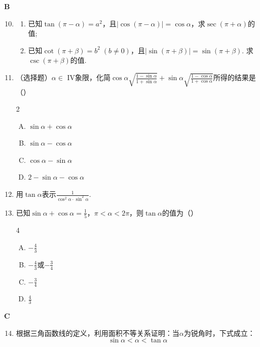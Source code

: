 \begin{center}
    \bfseries B
\end{center}
\begin{enumerate}\setcounter{enumi}{9}
    \item \begin{enumerate}[(1)]
        \item 已知$\tan(\pi-\alpha)=a^2$，且$|\cos(\pi-\alpha)|=\cos\alpha$，求$\sec(\pi+\alpha)$的值;
        \item 已知$\cot(\pi+\beta)=b^2\; (b\ne 0)$，且$|\sin(\pi+\beta)|=\sin(\pi+\beta)$. 求$\csc(\pi+\beta)$的值.
    \end{enumerate}

\item （选择题）$\alpha\in $ IV象限，化简$\cos\alpha\sqrt{\frac{1-\sin\alpha}{1+\sin\alpha}}+\sin\alpha\sqrt{\frac{1-\cos\alpha}{1+\cos\alpha}}$所得的结果是\hfill（\qquad ）
\begin{multicols}{2}
\begin{enumerate}[(A)]
    \item $\sin\alpha+\cos\alpha$
    \item $\sin\alpha-\cos\alpha$
    \item $\cos\alpha-\sin\alpha$
    \item $2-\sin\alpha-\cos\alpha$
\end{enumerate}
\end{multicols}

\item 用$\tan\alpha$表示$\frac{1}{\cos^2\alpha\cdot \sin^2\alpha}$.
\item 已知$\sin\alpha+\cos\alpha=\frac{1}{5}$，$\pi<\alpha<2\pi$，则$\tan\alpha$的值为\hfill（\qquad）
\begin{multicols}{4}
\begin{enumerate}[(A)]
    \item $-\frac{4}{3}$
    \item $-\frac{4}{3}$或$-\frac{3}{4}$
    \item $-\frac{3}{4}$
    \item $\frac{4}{3}$
\end{enumerate}
\end{multicols}
\end{enumerate}

\begin{center}
    \bfseries C
\end{center}


    \begin{enumerate}\setcounter{enumi}{13}
        \item 根据三角函数线的定义，利用面积不等关系证明：当$\alpha$为锐角时，下式成立：
    \[\sin\alpha<\alpha<\tan\alpha\]
    \end{enumerate}


